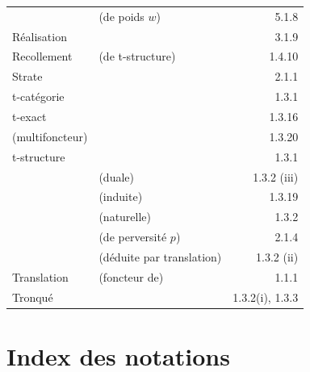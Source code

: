 \documentclass[12pt,a4paper]{article}
\theoremstyle{plain}
\theoremstyle{definition}
\theoremstyle{remark}
\begin{document}
\begin{tabular}{lp{8cm}r}
& (de poids $w$) & 5.1.8 \\[4pt]
R\'ealisation & & 3.1.9 \\
Recollement & (de t-structure) & 1.4.10 \\[4pt]
Strate & & 2.1.1 \\[4pt]
t-cat\'egorie & & 1.3.1 \\[4pt]
t-exact & & 1.3.16 \\
\quad (multifoncteur) & & 1.3.20 \\[4pt]
t-structure & & 1.3.1 \\
& (duale) & 1.3.2 (iii) \\
& (induite) & 1.3.19 \\
& (naturelle) & 1.3.2 \\
& (de perversit\'e $p$) & 2.1.4 \\
& (d\'eduite par translation) & 1.3.2 (ii) \\[4pt]
Translation & (foncteur de) & 1.1.1 \\[4pt]
Tronqu\'e & & 1.3.2(i), 1.3.3
\end{tabular}

\newpage
\section*{Index des notations}
\end{document}
